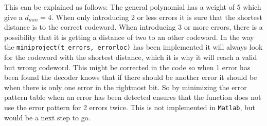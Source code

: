 \documentclass[Main]{subfiles}
\begin{document}
This can be explained as follows:
The general polynomial has a weight of 5 which give a $d_{min}=4$.
When only introducing 2 or less errors it is sure that the shortest distance is to the correct codeword.
When introducing 3 or more errors, there is a possibility that it is getting a distance of two to an other codeword.
In the way the \texttt{miniproject(t\_errors, errorloc)} has been implemented it will always look for the codeword with the shortest distance, which it is why it will reach a valid but wrong codeword.
This might be corrected in the code so when 1 error has been found the decoder knows that if there should be another error it should be when there is only one error in the rightmost bit.
So by minimizing the error pattern table when an error has been detected ensures that the function does not use the error pattern for 2 errors twice.
This is not implemented in \texttt{Matlab}, but would be a next step to go. 
\end{document}
